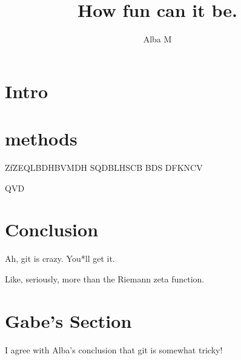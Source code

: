 \documentclass{article}
\author{Alba M}
\title{How fun can it be.}
\begin{document}
	\maketitle
	\section{Intro}
	\section{methods}
	ZfZEQLBDHBVMDH
	SQDBLHSCB
	BDS
	DFKNCV
	
	QVD
	
	\section{Conclusion}
	Ah, git is crazy. You*ll get it.
	
	Like, seriously, more than the Riemann zeta function.

	\section{Gabe's Section}
	I agree with Alba's conclusion that git is somewhat tricky!
\end{document}
